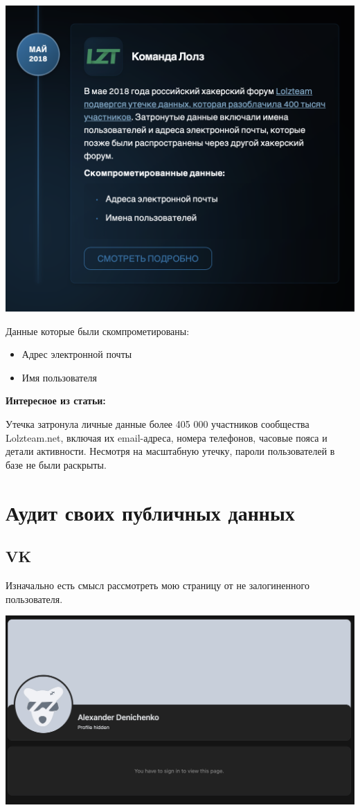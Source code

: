 \documentclass{article}
\begin{document}
\begin{center}
    \includegraphics[width=.9\textwidth]{5}
\end{center}

Данные которые были скомпрометированы:

\begin{itemize}
    \item Адрес электронной почты
    \item Имя пользователя
\end{itemize}

\textbf{Интересное из статьи: }

Утечка затронула личные данные более 405 000 участников сообщества Lolzteam.net, включая их email-адреса, номера телефонов, часовые пояса и детали активности. 
Несмотря на масштабную утечку, пароли пользователей в базе не были раскрыты.

\section{Аудит своих публичных данных}

\subsection{VK}

Изначально есть смысл рассмотреть мою страницу от не залогиненного пользователя.
\begin{center}
    \includegraphics[width=.9\textwidth]{vk}
\end{center}
\end{document}
